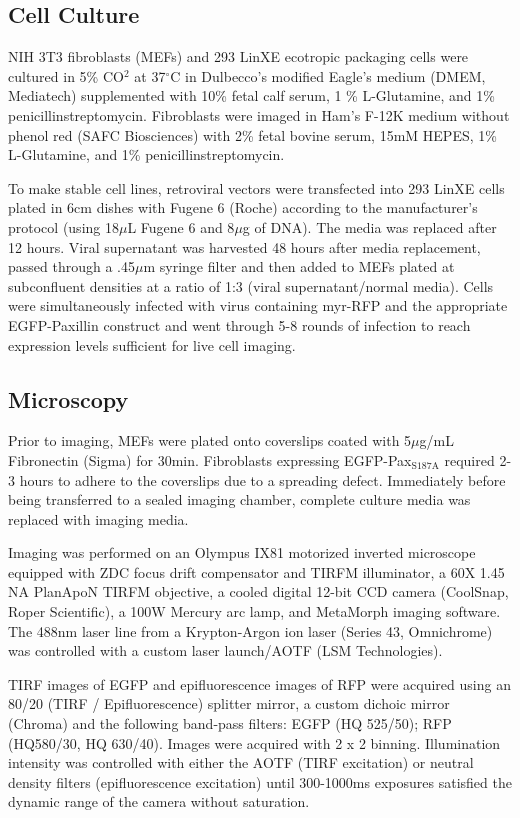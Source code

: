 \documentclass[10pt]{article}
\begin{document}
\subsection*{Cell Culture}

NIH 3T3 fibroblasts (MEFs) and 293 LinXE ecotropic packaging cells were cultured
in 5\% CO$^2$ at 37$^\circ$C in Dulbecco's modified Eagle's medium (DMEM, Mediatech)
supplemented with 10\% fetal calf serum, 1 \% L-Glutamine, and 1\%
penicillinstreptomycin. Fibroblasts were imaged in Ham's F-12K medium without
phenol red (SAFC Biosciences) with 2\% fetal bovine serum, 15mM HEPES, 1\%
L-Glutamine, and 1\% penicillinstreptomycin. 

To make stable cell lines, retroviral vectors were transfected into 293 LinXE
cells plated in 6cm dishes with Fugene 6 (Roche) according to the manufacturer's
protocol (using 18$\mu$L Fugene 6 and 8$\mu$g of DNA). The media was replaced
after 12 hours. Viral supernatant was harvested 48 hours after media
replacement, passed through a .45$\mu$m syringe filter and then added to MEFs
plated at subconfluent densities at a ratio of 1:3 (viral supernatant/normal
media). Cells were simultaneously infected with virus containing myr-RFP and
the appropriate EGFP-Paxillin construct and went through 5-8 rounds of infection
to reach expression levels sufficient for live cell imaging.

\subsection*{Microscopy}

Prior to imaging, MEFs were plated onto coverslips coated with 5$\mu$g/mL
Fibronectin (Sigma) for 30min. Fibroblasts expressing EGFP-Pax$_{\textrm{S187A}}$
required 2-3 hours to adhere to the coverslips due to a spreading defect.
Immediately before being transferred to a sealed imaging chamber, complete
culture media was replaced with imaging media. 

Imaging was performed on an Olympus IX81 motorized inverted microscope equipped
with ZDC focus drift compensator and TIRFM illuminator, a 60X 1.45 NA PlanApoN
TIRFM objective, a cooled digital 12-bit CCD camera (CoolSnap, Roper
Scientific), a 100W Mercury arc lamp, and MetaMorph imaging software. The 488nm
laser line from a Krypton-Argon ion laser (Series 43, Omnichrome) was controlled
with a custom laser launch/AOTF (LSM Technologies).  

TIRF images of EGFP and epifluorescence images of RFP were acquired using an
80/20 (TIRF / Epifluorescence) splitter mirror, a custom dichoic mirror (Chroma)
and the following band-pass filters: EGFP (HQ 525/50); RFP (HQ580/30, HQ
630/40). Images were acquired with 2 x 2 binning. Illumination intensity was
controlled with either the AOTF (TIRF excitation) or neutral density filters
(epifluorescence excitation) until 300-1000ms exposures satisfied the dynamic
range of the camera without saturation. 
\end{document}
